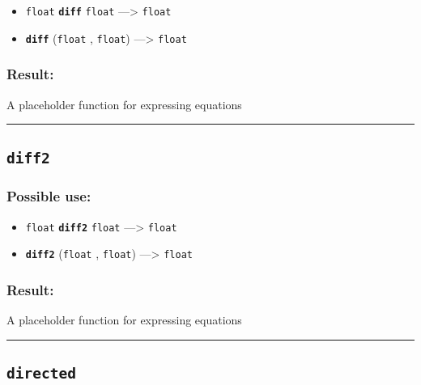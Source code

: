 \documentclass[]{book}
\providecommand{\tightlist}{%
  \setlength{\itemsep}{0pt}\setlength{\parskip}{0pt}}
\theoremstyle{definition}
\theoremstyle{definition}
\theoremstyle{definition}
\theoremstyle{remark}
\begin{document}
\begin{itemize}
\tightlist
\item
  \texttt{float} \textbf{\texttt{diff}} \texttt{float} ---\textgreater{}
  \texttt{float}
\item
  \textbf{\texttt{diff}} (\texttt{float} , \texttt{float})
  ---\textgreater{} \texttt{float}
\end{itemize}

\subsubsection{Result:}\label{result-126}

A placeholder function for expressing equations

\begin{center}\rule{0.5\linewidth}{\linethickness}\end{center}

\subsection{\texorpdfstring{\texttt{diff2}}{diff2}}\label{diff2}

\subsubsection{Possible use:}\label{possible-use-131}

\begin{itemize}
\tightlist
\item
  \texttt{float} \textbf{\texttt{diff2}} \texttt{float}
  ---\textgreater{} \texttt{float}
\item
  \textbf{\texttt{diff2}} (\texttt{float} , \texttt{float})
  ---\textgreater{} \texttt{float}
\end{itemize}

\subsubsection{Result:}\label{result-127}

A placeholder function for expressing equations

\begin{center}\rule{0.5\linewidth}{\linethickness}\end{center}

\subsection{\texorpdfstring{\texttt{directed}}{directed}}\label{directed}
\end{document}
